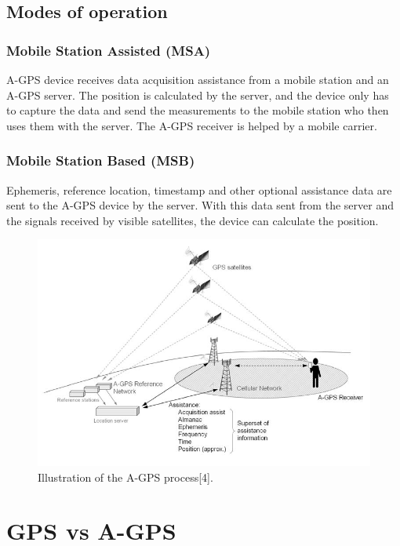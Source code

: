 \documentclass[conference]{IEEEtran}
\begin{document}
\subsection{Modes of operation}

\subsubsection{\textbf{Mobile Station Assisted} (\textbf{MSA)}}

A-GPS device receives data acquisition assistance from a mobile station and an A-GPS server. The position is calculated by the server, and the device only has to capture the data and send the measurements to the mobile station who then uses them with the server.
The A-GPS receiver is helped by a mobile carrier.

\subsubsection{\textbf{Mobile Station Based} (\textbf{MSB)}}

Ephemeris, reference location, timestamp and other optional assistance data are sent to the A-GPS device by the server. With this data sent from the server and the signals received by visible satellites, the device can calculate the position.

\begin{figure}[h]
\includegraphics[width=\columnwidth]{img3.png}
    \caption{Illustration of the A-GPS process[4].}
\end{figure}

\section{GPS vs A-GPS}
\end{document}
